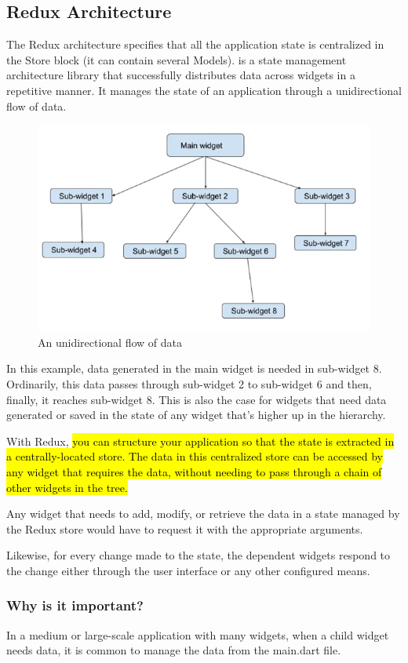 \subsection{Redux Architecture}
The Redux architecture specifies that all the application state is centralized in the
Store block (it can contain several Models). is a state management architecture library 
that successfully distributes data across widgets in a repetitive 
manner. It manages the state of an application through a unidirectional flow of data.

\begin{figure}[h]
\centering
\includegraphics[width=0.4\linewidth]{figures/11_flow_data.png}
\caption{An unidirectional flow of data}
\label{fig:flow_data}
\end{figure}
In this example, data generated in the main widget is needed in sub-widget 8. 
Ordinarily, this data passes through sub-widget 2 to sub-widget 6 and then, finally, 
it reaches sub-widget 8. This is also the case for widgets that need data 
generated or saved in the state of any widget that's higher up in the hierarchy.

With Redux, \hl{you can structure your application so that the state is extracted in 
a centrally-located store. The data in this centralized store can be accessed 
by any widget that requires the data, without needing to pass through a chain of 
other widgets in the tree.}

Any widget that needs to add, modify, or retrieve the data in a state managed by the 
Redux store would have to request it with the appropriate arguments.

Likewise, for every change made to the state, the dependent widgets respond to the change 
either through the user interface or any other configured means.

\subsubsection{Why is it important?}
In a medium or large-scale application with many widgets, when a child widget needs data, 
it is common to manage the data from the main.dart file.

